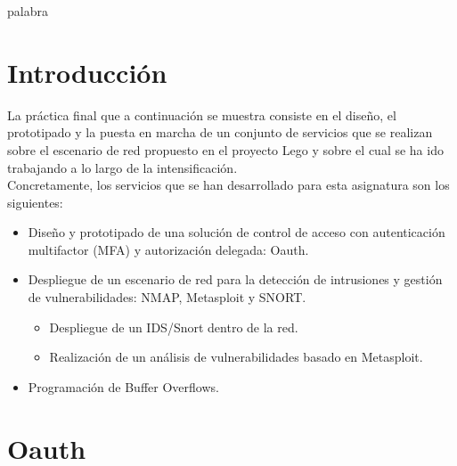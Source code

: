 \documentclass[a4,12pt,onecolum]{article}
\begin{document}

\thispagestyle{empty}
\textcolor[rgb]{1.00,1.00,1.00}{palabra} %
\newpage

\setcounter{page}{3}


\newpage
\tableofcontents 		%
\newpage



\clearpage
\section{Introducción}

La práctica final que a continuación se muestra consiste en el diseño, el prototipado y la puesta en marcha de un conjunto de servicios que se realizan sobre el escenario de red propuesto en el proyecto Lego y sobre el cual se ha ido trabajando a lo largo de la intensificación. \\

Concretamente, los servicios que se han desarrollado para esta asignatura son los siguientes:

\begin{itemize}
  \item Diseño y prototipado de una solución de control de acceso con autenticación multifactor (MFA) y autorización delegada: Oauth.

  \item Despliegue de un escenario de red para la detección de intrusiones y gestión de vulnerabilidades: NMAP, Metasploit y SNORT.
  \begin{itemize}
    \item Despliegue de un IDS/Snort dentro de la red.
    \item Realización de un análisis de vulnerabilidades basado en Metasploit.
  \end{itemize}

  \item Programación de Buffer Overflows.

\end{itemize}


\clearpage
\section{Oauth}
\end{document}
